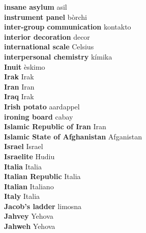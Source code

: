 \textbf{ insane asylum  } asil \\
\textbf{ instrument panel  } bòrchi \\
\textbf{ inter-group communication  } kontakto \\
\textbf{ interior decoration  } decor \\
\textbf{ international scale  } Celsius \\
\textbf{ interpersonal chemistry  } kímika \\
\textbf{ Inuit  } èskimo \\
\textbf{ Irak  } Irak \\
\textbf{ Iran  } Iran \\
\textbf{ Iraq  } Irak \\
\textbf{ Irish potato  } aardappel \\
\textbf{ ironing board  } cabay \\
\textbf{ Islamic Republic of Iran  } Iran \\
\textbf{ Islamic State of Afghanistan  } Afganistan \\
\textbf{ Israel  } Israel \\
\textbf{ Israelite  } Hudiu \\
\textbf{ Italia  } Italia \\
\textbf{ Italian Republic  } Italia \\
\textbf{ Italian  } Italiano \\
\textbf{ Italy  } Italia \\
\textbf{ Jacob’s ladder  } limosna \\
\textbf{ Jahvey  } Yehova \\
\textbf{ Jahweh  } Yehova \\

